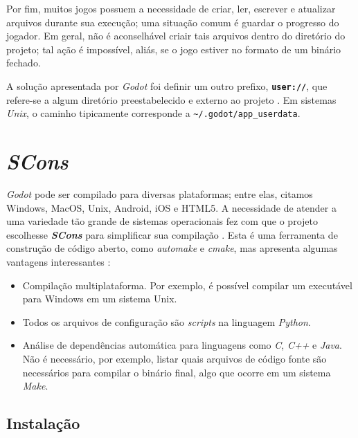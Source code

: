 Por fim, muitos jogos possuem a necessidade de criar, ler, escrever e atualizar arquivos durante sua execução; uma situação comum é guardar o progresso do jogador. Em geral, não é aconselhável criair tais arquivos dentro do diretório do projeto; tal ação é impossível, aliás, se o jogo estiver no formato de um binário fechado.

A solução apresentada por \textit{Godot} foi definir um outro prefixo, \textbf{\texttt{user://}}, que refere-se a algum diretório preestabelecido e externo ao projeto \citep{godotFileSystem}. Em sistemas \textit{Unix}, o caminho tipicamente corresponde a \texttt{\textasciitilde/.godot/app\_userdata}.


\section{\textit{SCons}}

\textit{Godot} pode ser compilado para diversas plataformas; entre elas, citamos Windows, MacOS, Unix, Android, iOS e HTML5. A necessidade de atender a uma variedade tão grande de sistemas operacionais fez com que o projeto escolhesse \textbf{\textit{SCons}} para simplificar sua compilação \citep{godotScons}. Esta é uma ferramenta de construção de código aberto, como \textit{automake} e \textit{cmake}, mas apresenta algumas vantagens interessantes \citep{scons}:

\begin{itemize}
\item Compilação multiplataforma. Por exemplo, é possível compilar um executável para Windows em um sistema Unix.

\item Todos os arquivos de configuração são \textit{scripts} na linguagem \textit{Python}.

\item Análise de dependências automática para linguagens como \textit{C}, \textit{C++} e \textit{Java}. Não é necessário, por exemplo, listar quais arquivos de código fonte são necessários para compilar o binário final, algo que ocorre em um sistema \textit{Make}.
\end{itemize}


\subsection{Instalação}

